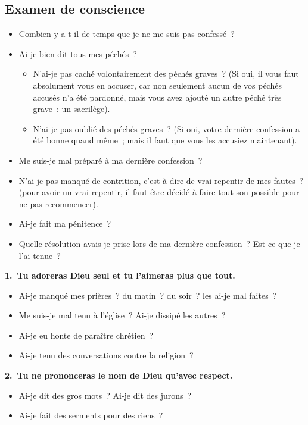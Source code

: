\documentclass[%
a5paper%
,11pt%
,DIV=15%
,titlepage=on%
,headings=optiontoheadandtoc%
,headings=small%
,parskip=false%
,titlepage%
,openany%
]{scrbook}
\newcommand{\commandement}[1]{\noindent\textbf{#1}}
\begin{document}
\subsection*{Examen de conscience}


\begin{itemize}
\item Combien y a-t-il de temps que je ne me suis pas confessé ?
\item Ai-je bien dit tous mes péchés ?
  \begin{itemize}
  \item N’ai-je pas caché volontairement des péchés graves ? (Si oui, il vous faut absolument vous en accuser, car non seulement aucun de vos péchés accusés n’a été pardonné, mais vous avez ajouté un autre péché très grave : un sacrilège).
  \item N’ai-je pas oublié des péchés graves ? (Si oui, votre dernière confession a été bonne quand même ; mais il faut que vous les accusiez maintenant).
  \end{itemize}
\item Me suis-je mal préparé à ma dernière confession ?
\item N’ai-je pas manqué de contrition, c’est-à-dire de vrai repentir de mes fautes ? (pour avoir un vrai repentir, il faut être décidé à faire tout son possible pour ne pas recommencer).
\item Ai-je fait ma pénitence ?
\item Quelle résolution avais-je prise lors de ma dernière confession ? Est-ce que je l’ai tenue ?
\end{itemize}


\commandement{1. Tu adoreras Dieu seul et tu l'aimeras plus que tout.}

\begin{itemize}
\item Ai-je manqué mes prières ? du matin ? du soir ? les ai-je mal faites ?
\item Me suis-je mal tenu à l’église ? Ai-je dissipé les autres ?
\item Ai-je eu honte de paraître chrétien ?
\item Ai-je tenu des conversations contre la religion ?
\end{itemize}

\commandement{2. Tu ne prononceras le nom de Dieu qu’avec respect.}
\begin{itemize}
\item Ai-je dit des gros mots ? Ai-je dit des jurons ?
\item Ai-je fait des serments pour des riens ?
\end{itemize}
\end{document}
